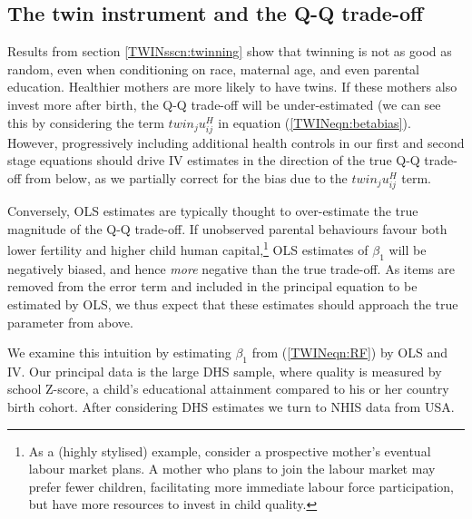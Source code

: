 \documentclass[subeqn]{article}
\begin{document}
\begin{spacing}{1.4}
\subsection{The twin instrument and the Q-Q trade-off} \label{TWINsscn:QQtwins}
Results from section \ref{TWINsscn:twinning} show that twinning is not as good
as random, even when conditioning on race, maternal age, and even parental 
education. Healthier mothers are more likely to have twins. If these mothers 
also invest more after birth, the Q-Q trade-off will be under-estimated (we can 
see this by considering the term $twin_ju^H_{ij}$ in equation 
(\ref{TWINeqn:betabias}).  However, progressively including additional health
controls in our first and second stage equations should drive IV estimates in 
the direction of the true Q-Q trade-off from below, as we partially correct for 
the bias due to the $twin_ju^H_{ij}$ term.

Conversely, OLS estimates are typically thought to over-estimate the true 
magnitude of the Q-Q trade-off.  If unobserved parental behaviours favour both
lower fertility and higher child human capital,\footnote{As a (highly stylised) 
example, consider a prospective mother's eventual labour market plans. A mother 
who plans to join the labour market may prefer fewer children, facilitating more 
immediate labour force participation, but have more resources to invest in child
quality.} OLS estimates of $\beta_1$ will be negatively biased, and hence 
\emph{more} negative than the true trade-off.  As items are removed from the
error term and included in the principal equation to be estimated by OLS, we thus 
expect that these estimates should approach the true parameter from above.

We examine this intuition by estimating $\beta_1$ from (\ref{TWINeqn:RF}) by OLS 
and IV. Our principal data is the large DHS sample, where quality is measured by
school Z-score, a child's educational attainment compared to his or her country
birth cohort.  After considering DHS estimates we turn to NHIS data from USA.


\end{spacing}
\end{document}
